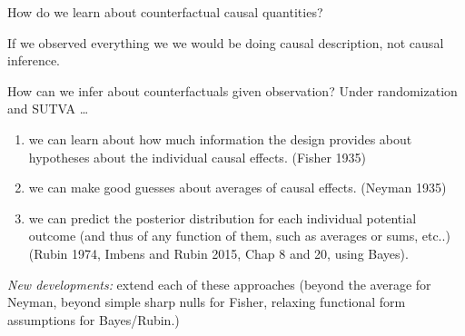 \begin{frame}[]{How do we learn about counterfactual causal quantities?}

  If we observed everything we we would be doing causal description, not
  causal inference. 

  \medskip

  How can we infer about counterfactuals given observation? Under
  randomization and SUTVA \ldots

  \begin{enumerate}
    \item we can learn about how much information the design provides about
      hypotheses about the individual causal effects. (Fisher 1935)
    \item we can make good guesses about averages of causal effects. (Neyman
      1935)
    \item we can predict the posterior distribution for each individual
      potential outcome (and thus of any function of them, such as averages or
      sums, etc..) (Rubin 1974, Imbens and Rubin 2015, Chap 8 and 20, using Bayes).
  \end{enumerate}

  \emph{New developments:} extend each of these approaches (beyond the average for
  Neyman, beyond simple sharp nulls for Fisher, relaxing functional form
  assumptions for Bayes/Rubin.)
\end{frame}



